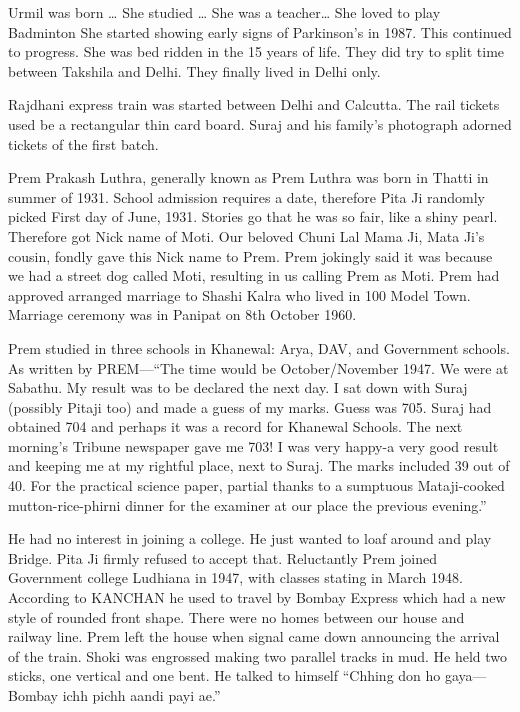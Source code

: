 Urmil was born …
She studied …
She was a teacher…
She loved to play Badminton
She started showing early signs of Parkinson’s in 1987. This continued to progress. She was bed ridden in the 15 years of life. They did try to split time between Takshila and Delhi. They finally lived in Delhi only. 

Rajdhani express train was started between Delhi and Calcutta. The rail tickets used be a rectangular thin card board. Suraj and his family’s photograph adorned tickets of the first batch. 

Prem Prakash Luthra, generally known as Prem Luthra was born in Thatti in summer of 1931. School admission requires a date, therefore Pita Ji randomly picked First day of June, 1931. Stories go that he was so fair, like a shiny pearl. Therefore got Nick name of Moti. Our beloved Chuni Lal Mama Ji, Mata Ji’s cousin, fondly gave this Nick name to Prem. Prem jokingly said it was because we had a street dog called Moti, resulting in us calling Prem as Moti. 
Prem had approved arranged marriage to Shashi Kalra who lived in 100 Model Town. Marriage ceremony was in Panipat on 8th October 1960. 

Prem studied in three schools in Khanewal: Arya, DAV, and Government schools. As written by PREM—“The time would be October/November 1947. We were at Sabathu. My result was to be declared the next day. I sat down with Suraj (possibly Pitaji too) and made a guess of my marks. Guess was 705. Suraj had obtained 704 and perhaps it was a record for Khanewal Schools. The next morning’s Tribune newspaper gave me 703! I was very happy-a very good result and keeping me at my rightful place, next to Suraj. The marks included 39 out of 40. For the practical science paper, partial thanks to a sumptuous Mataji-cooked mutton-rice-phirni dinner for the examiner at our place the previous evening.”

He had no interest in joining a college. He just wanted to loaf around and play Bridge. Pita Ji firmly refused to accept that. Reluctantly Prem joined Government college Ludhiana in 1947, with classes stating in March 1948. 
According to KANCHAN he used to travel by Bombay Express which had a new style of rounded front shape. There were no homes between our house and railway line. Prem left the house when signal came down announcing the arrival of the train. Shoki was engrossed making two parallel tracks in mud. He held two sticks, one vertical and one bent. He talked to himself “Chhing don ho gaya—Bombay ichh pichh aandi payi ae.” 


